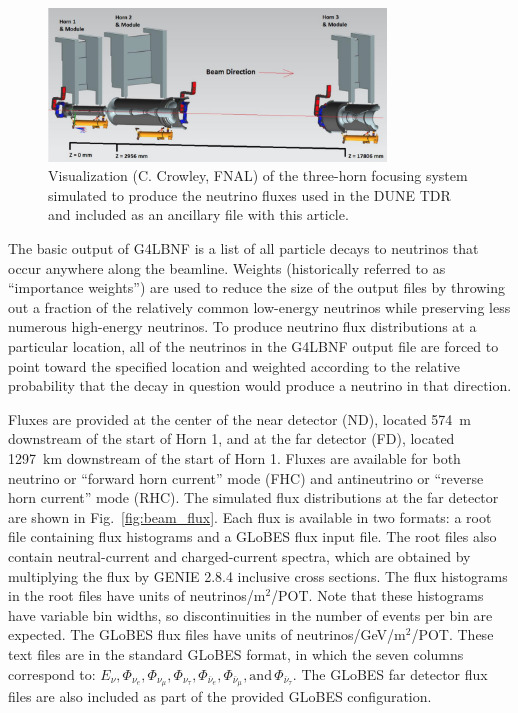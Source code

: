 \documentclass[aps,prd,superscriptaddress]{revtex4-1}
\newcommand{\nue}{\mbox{$\nu_e$}}
\newcommand{\nuebar}{\mbox{$\overline\nu_e$}}
\newcommand{\numu}{\mbox{$\nu_{\mu}$}}
\newcommand{\numubar}{\mbox{$\overline\nu_{\mu}$}}
\newcommand{\nutau}{\mbox{$\nu_{\tau}$}}
\newcommand{\nutaubar}{\mbox{$\overline\nu_{\tau}$}}
\begin{document}
\begin{figure}[!htpb]
  \centering
  \includegraphics[width=0.8\textwidth]{beam_vis.png}
  \caption{Visualization (C. Crowley, FNAL) of the three-horn focusing system simulated to produce the
    neutrino fluxes used in
  the DUNE TDR and included as an ancillary file with this article.}
  \label{fig:beam_vis}
\end{figure}

The basic output of G4LBNF is a list of all particle decays to neutrinos that occur anywhere along the beamline.
Weights (historically referred to as “importance weights”) are used to reduce the size of the output files by
throwing out a fraction of the relatively common low-energy neutrinos while preserving less numerous
high-energy neutrinos.
To produce neutrino flux distributions at a particular
location, all of the neutrinos in the G4LBNF output file are forced to point toward the specified location and
weighted according to the relative probability that the decay in question would produce a neutrino in
that direction\cite{pavlovic_thesis}.

Fluxes are provided at the center of the near detector (ND), located 574~m downstream
of the start of Horn 1, and
at the far detector (FD), located 1297~km downstream of the start of Horn 1.  Fluxes are available for both
neutrino or ``forward horn current'' mode (FHC) and
antineutrino or ``reverse horn current'' mode (RHC).
The simulated flux distributions at the far detector are shown in Fig.~\ref{fig:beam_flux}.
Each flux is available in two formats: a root file containing flux histograms and a
GLoBES flux input file.  The root files also contain neutral-current and charged-current spectra,
which are obtained by multiplying the flux by GENIE 2.8.4
inclusive cross sections. The flux histograms in the root files have units of neutrinos/$\mathrm{m^2}$/POT.
Note that these histograms have variable bin widths, so discontinuities in the number
of events per bin
are expected.
The GLoBES flux files have units of neutrinos/GeV/$\mathrm{m^2}$/POT. These text files are in the standard
GLoBES format, in which the seven columns correspond to:
$E_{\nu}, \Phi_{\nue}, \Phi_{\numu}, \Phi_{\nutau}, \Phi_{\nuebar}, \Phi_{\numubar},
\mathrm{and} \, \Phi_{\nutaubar}$. The GLoBES far detector flux files are also included as part of the
provided GLoBES configuration.
\end{document}
